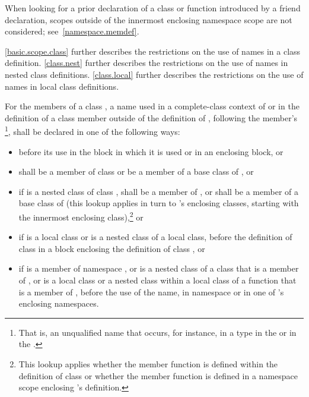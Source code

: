 \begin{note}
When looking for a prior declaration of a class
or function introduced by a friend declaration, scopes outside
of the innermost enclosing namespace scope are not considered;
see~\ref{namespace.memdef}.
\end{note}
\begin{note}
\ref{basic.scope.class}
further describes the restrictions on the use of names in a class
definition. \ref{class.nest} further describes the restrictions on the
use of names in nested class definitions. \ref{class.local} further
describes the restrictions on the use of names in local class
definitions.
\end{note}

\pnum
For the members of a class , a name used
in a complete-class context of  or
in the definition of a class member outside of the definition of ,
following the member's
\footnote{That is, an unqualified name that occurs,
for instance, in a
type in the
 or in the
.}, shall be declared in one of the
following ways:
\begin{itemize}
\item before its use in the block in which it is used or in an enclosing
block, or

\item shall be a member of class  or be a member of a base
class of , or

\item if 
is a nested class of class , shall be a
member of , or shall be a member of a base class of 
(this lookup applies in turn to 's enclosing classes, starting
with the innermost enclosing class),\footnote{This lookup applies whether
the member function is defined
within the definition of class  or whether the member function
is defined in a namespace scope enclosing 's definition.}
or

\item if  is a local class or is a nested
class of a local class, before the definition of class  in a
block enclosing the definition of class , or

\item if  is a member of namespace , or is a nested
class of a class that is a member of , or is a local class or a
nested class within a local class of a function that is a member of
, before the use of the name, in namespace 
or in one of 's enclosing namespaces.
\end{itemize}
